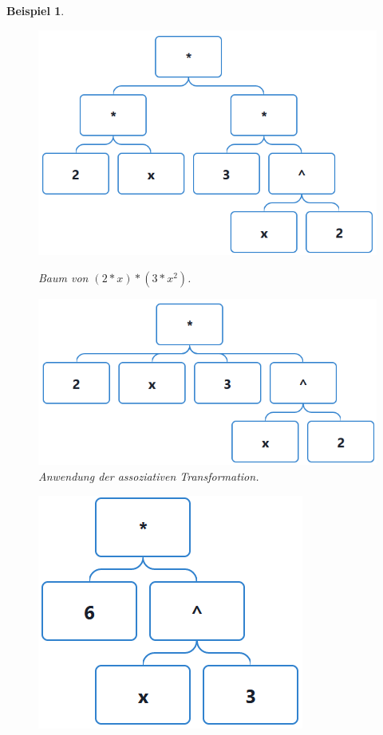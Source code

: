 \documentclass[11pt]{article}
\newtheorem{example}{Beispiel}
\begin{document}
\begin{example}
  \begin{figure}[h]
    \begin{minipage}{.5\textwidth}
      \centering
      \includegraphics[scale=0.45]{trees/product/beispiel_1_1.png}
      \caption{Baum von $(2*x)*(3*x^2)$.}
    \end{minipage}
    \begin{minipage}{.5\textwidth}
      \centering
      \includegraphics[scale=0.45]{trees/product/beispiel_1_2.png}
      \caption{Anwendung der assoziativen Transformation.}
    \end{minipage}
  \end{figure}
  \begin{figure}[h]
    \centering
    \includegraphics*[scale=0.5]{trees/product/beispiel_1_3.png}

\end{figure}
\end{example}
\end{document}
